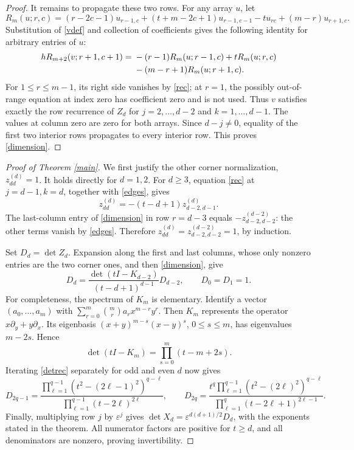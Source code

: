\documentclass[10pt]{article}
\begin{document}
\begin{proof}
It remains to propagate these two rows. For any array \(u\), let
\[
 R_m(u;r,c)=(r-2c-1)u_{r-1,c}+(t+m-2c+1)u_{r-1,c-1}
             -tu_{rc}+(m-r)u_{r+1,c}.
\]
Substitution of \eqref{vdef} and collection of coefficients gives the
following identity for arbitrary entries of \(u\):
\begin{align}\label{intertwine}
 hR_{m+2}(v;r+1,c+1)
 ={}&-(r-1)R_m(u;r-1,c)+tR_m(u;r,c)\notag\\
    &-(m-r+1)R_m(u;r+1,c).
\end{align}
For \(1\le r\le m-1\), its right side vanishes by \eqref{rec};
at \(r=1\), the possibly out-of-range equation at index zero has
coefficient zero and is not used. Thus \(v\) satisfies exactly the
row recurrence of \(Z_d\) for \(j=2,\ldots,d-2\) and
\(k=1,\ldots,d-1\). The values at column zero are zero for both
arrays. Since \(d-j\ne0\), equality of the first two interior rows
propagates to every interior row. This proves \eqref{dimension}.
\end{proof}

\begin{proof}[Proof of Theorem \ref{main}]
We first justify the other corner normalization, \(z^{(d)}_{dd}=1\).
It holds directly for \(d=1,2\). For \(d\ge3\), equation \eqref{rec}
at \(j=d-1,k=d\), together with \eqref{edges}, gives
\[
 z^{(d)}_{dd}=-(t-d+1)z^{(d)}_{d-2,d-1}.
\]
The last-column entry of \eqref{dimension} in row \(r=d-3\)
equals \(-z^{(d-2)}_{d-2,d-2}\): the other terms vanish by
\eqref{edges}. Therefore
\(z^{(d)}_{dd}=z^{(d-2)}_{d-2,d-2}=1\), by induction.

Set \(D_d=\det Z_d\). Expansion along the first and last columns,
whose only nonzero entries are the two corner ones, and then
\eqref{dimension}, give
\begin{equation}\label{detrec}
 D_d=\frac{\det(tI-K_{d-2})}{(t-d+1)^{d-1}}D_{d-2},
 \qquad D_0=D_1=1.
\end{equation}
For completeness, the spectrum of \(K_m\) is elementary. Identify
a vector \((a_0,\ldots,a_m)\) with
\(\sum_{r=0}^m\binom mr a_r x^{m-r}y^r\). Then \(K_m\) represents
the operator \(x\partial_y+y\partial_x\). Its eigenbasis
\((x+y)^{m-s}(x-y)^s\), \(0\le s\le m\), has eigenvalues
\(m-2s\). Hence
\[
 \det(tI-K_m)=\prod_{s=0}^m(t-m+2s).
\]
Iterating \eqref{detrec} separately for odd and even \(d\) now gives
\[
 D_{2q-1}=\frac{\prod_{\ell=1}^{q-1}(t^2-(2\ell-1)^2)^{q-\ell}}
                    {\prod_{\ell=1}^{q-1}(t-2\ell)^{2\ell}},\qquad
 D_{2q}=\frac{t^q\prod_{\ell=1}^{q-1}(t^2-(2\ell)^2)^{q-\ell}}
                    {\prod_{\ell=1}^q(t-2\ell+1)^{2\ell-1}}.
\]
Finally, multiplying row \(j\) by \(\varepsilon^j\) gives
\(\det X_d=\varepsilon^{d(d+1)/2}D_d\), with the exponents stated
in the theorem. All numerator factors are positive for \(t\ge d\),
and all denominators are nonzero, proving invertibility.
\end{proof}
\end{document}
